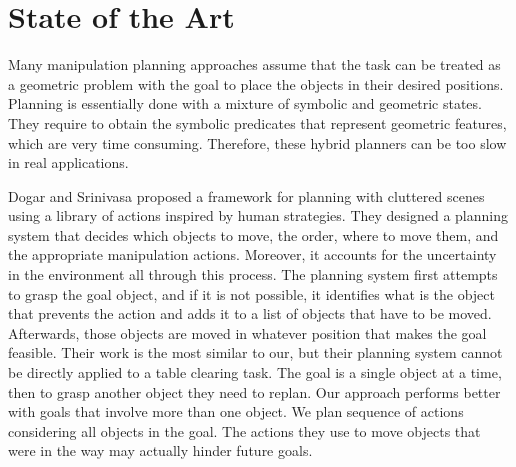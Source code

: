 \chapter{State of the Art}
\label{ch:state_of_the_art}

Many manipulation planning approaches\citep{PlanningAlgorithms} assume that the task can be treated as a geometric problem with the goal to place the objects in their desired positions. Planning is essentially done with a mixture %
of symbolic and geometric states. They require to obtain the symbolic predicates that represent geometric features, which are very time consuming. Therefore, these hybrid planners can be too slow in real applications.  



Dogar and Srinivasa \cite{Dogar2011} proposed a framework for planning with cluttered scenes using a library of actions inspired by human strategies. They designed a planning system that decides which
objects to move, the order, where to move them, and the appropriate manipulation actions. Moreover, it accounts for the uncertainty
in the environment all through this process. 
The planning system first attempts to grasp the goal object, and if it is not possible, it identifies what is the object that prevents the action and adds it to a list of objects that have to be moved. Afterwards, those objects are moved in whatever position that makes the goal feasible. 
Their work is the most similar to our, but their planning system cannot be directly applied to a table clearing task. The goal is a single object at a time, then to grasp another object they need to replan. Our approach performs better with goals that involve more than one object. We plan sequence of actions considering all objects in the goal. The actions they use to move objects that were in the way may actually hinder future goals.


